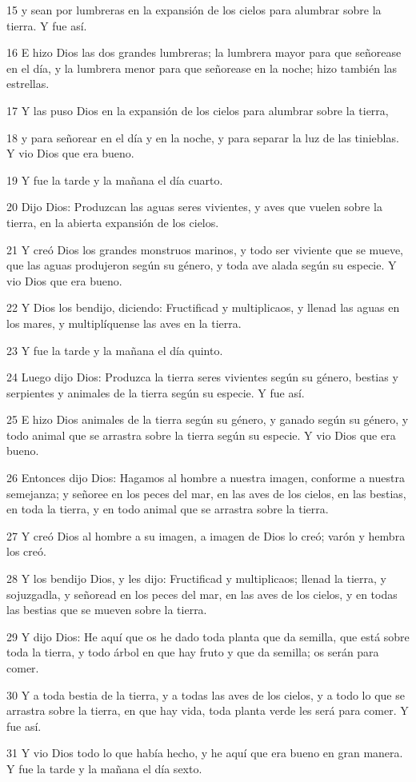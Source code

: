 \par 15 y sean por lumbreras en la expansión de los cielos para alumbrar sobre la tierra. Y fue así.
\par 16 E hizo Dios las dos grandes lumbreras; la lumbrera mayor para que señorease en el día, y la lumbrera menor para que señorease en la noche; hizo también las estrellas.
\par 17 Y las puso Dios en la expansión de los cielos para alumbrar sobre la tierra,
\par 18 y para señorear en el día y en la noche, y para separar la luz de las tinieblas. Y vio Dios que era bueno.
\par 19 Y fue la tarde y la mañana el día cuarto.
\par 20 Dijo Dios: Produzcan las aguas seres vivientes, y aves que vuelen sobre la tierra, en la abierta expansión de los cielos.
\par 21 Y creó Dios los grandes monstruos marinos, y todo ser viviente que se mueve, que las aguas produjeron según su género, y toda ave alada según su especie. Y vio Dios que era bueno.
\par 22 Y Dios los bendijo, diciendo: Fructificad y multiplicaos, y llenad las aguas en los mares, y multiplíquense las aves en la tierra.
\par 23 Y fue la tarde y la mañana el día quinto.
\par 24 Luego dijo Dios: Produzca la tierra seres vivientes según su género, bestias y serpientes y animales de la tierra según su especie. Y fue así.
\par 25 E hizo Dios animales de la tierra según su género, y ganado según su género, y todo animal que se arrastra sobre la tierra según su especie. Y vio Dios que era bueno.
\par 26 Entonces dijo Dios: Hagamos al hombre a nuestra imagen, conforme a nuestra semejanza; y señoree en los peces del mar, en las aves de los cielos, en las bestias, en toda la tierra, y en todo animal que se arrastra sobre la tierra.
\par 27 Y creó Dios al hombre a su imagen, a imagen de Dios lo creó; varón y hembra los creó.
\par 28 Y los bendijo Dios, y les dijo: Fructificad y multiplicaos; llenad la tierra, y sojuzgadla, y señoread en los peces del mar, en las aves de los cielos, y en todas las bestias que se mueven sobre la tierra.
\par 29 Y dijo Dios: He aquí que os he dado toda planta que da semilla, que está sobre toda la tierra, y todo árbol en que hay fruto y que da semilla; os serán para comer.
\par 30 Y a toda bestia de la tierra, y a todas las aves de los cielos, y a todo lo que se arrastra sobre la tierra, en que hay vida, toda planta verde les será para comer. Y fue así.
\par 31 Y vio Dios todo lo que había hecho, y he aquí que era bueno en gran manera. Y fue la tarde y la mañana el día sexto.

